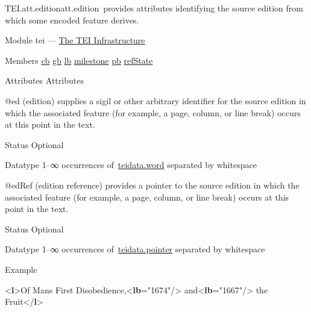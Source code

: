 \begin{reflist}
\item[]\begin{specHead}{TEI.att.edition}{att.edition} provides attributes identifying the source edition from which some encoded feature derives.\end{specHead} 
    \item[{Module}]
  tei — \hyperref[ST]{The TEI Infrastructure}
    \item[{Members}]
  \hyperref[TEI.cb]{cb} \hyperref[TEI.gb]{gb} \hyperref[TEI.lb]{lb} \hyperref[TEI.milestone]{milestone} \hyperref[TEI.pb]{pb} \hyperref[TEI.refState]{refState}
    \item[{Attributes}]
  Attributes\hfil\\[-10pt]\begin{sansreflist}
    \item[@ed]
  (edition) supplies a sigil or other arbitrary identifier for the source edition in which the associated feature (for example, a page, column, or line break) occurs at this point in the text.
\begin{reflist}
    \item[{Status}]
  Optional
    \item[{Datatype}]
  1–∞ occurrences of \hyperref[TEI.teidata.word]{teidata.word} separated by whitespace
\end{reflist}  
    \item[@edRef]
  (edition reference) provides a pointer to the source edition in which the associated feature (for example, a page, column, or line break) occurs at this point in the text.
\begin{reflist}
    \item[{Status}]
  Optional
    \item[{Datatype}]
  1–∞ occurrences of \hyperref[TEI.teidata.pointer]{teidata.pointer} separated by whitespace
\end{reflist}  
\end{sansreflist}  
    \item[{Example}]
  \leavevmode\bgroup{}\exampleFont \begin{shaded}\noindent\mbox{}{<\textbf{l}>}Of Mans First Disobedience,{<\textbf{lb}\hspace*{1em}{ed}="{1674}"/>} and{<\textbf{lb}\hspace*{1em}{ed}="{1667}"/>} the Fruit{</\textbf{l}>}\mbox{}\newline 

\end{shaded}
\end{reflist}

